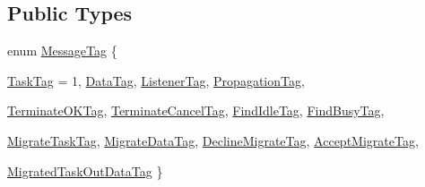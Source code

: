 \subsection*{Public Types}
\begin{DoxyCompactItemize}
\item 
enum \hyperlink{class_mail_box_a3699f2a3318218702288ec9fb7f8e38f}{MessageTag} \{ \par
\hyperlink{class_mail_box_a3699f2a3318218702288ec9fb7f8e38faf012aed1646a6269dd130a7be7c697e1}{TaskTag} = 1, 
\hyperlink{class_mail_box_a3699f2a3318218702288ec9fb7f8e38fa008868e6b3029ad80db19a0cc4ab48c9}{DataTag}, 
\hyperlink{class_mail_box_a3699f2a3318218702288ec9fb7f8e38fa04ccc470eaee013c03bf8f2450137d8a}{ListenerTag}, 
\hyperlink{class_mail_box_a3699f2a3318218702288ec9fb7f8e38fa95087e9821f25d9f57fa60e38bce55eb}{PropagationTag}, 
\par
\hyperlink{class_mail_box_a3699f2a3318218702288ec9fb7f8e38fa619d49f84b303625b3fbb7e92cbfbb97}{TerminateOKTag}, 
\hyperlink{class_mail_box_a3699f2a3318218702288ec9fb7f8e38fad0a61b9def0e672b78af6f92ed12312b}{TerminateCancelTag}, 
\hyperlink{class_mail_box_a3699f2a3318218702288ec9fb7f8e38fa8580283be0c3cde77bfd7baa4499f94e}{FindIdleTag}, 
\hyperlink{class_mail_box_a3699f2a3318218702288ec9fb7f8e38fa6cbe6d7de11daf086db733c963202011}{FindBusyTag}, 
\par
\hyperlink{class_mail_box_a3699f2a3318218702288ec9fb7f8e38fa3b5cca06c2573ad16f90d7da519f4888}{MigrateTaskTag}, 
\hyperlink{class_mail_box_a3699f2a3318218702288ec9fb7f8e38fad9a3b041138ef8d62c7e4a3bd6f2280e}{MigrateDataTag}, 
\hyperlink{class_mail_box_a3699f2a3318218702288ec9fb7f8e38fa9e01327077e6b75c561a7b600bb23df6}{DeclineMigrateTag}, 
\hyperlink{class_mail_box_a3699f2a3318218702288ec9fb7f8e38faec829edd0cd7b7d322a7027a86c90bd5}{AcceptMigrateTag}, 
\par
\hyperlink{class_mail_box_a3699f2a3318218702288ec9fb7f8e38fa56ea80305e12502739ecdd2ffc068322}{MigratedTaskOutDataTag}
 \}
\end{DoxyCompactItemize}
